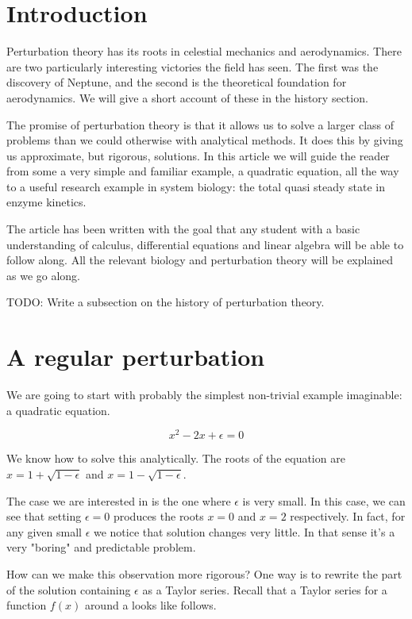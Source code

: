 \documentclass[12pt]{article}
\begin{document}
\section{Introduction}

Perturbation theory has its roots in celestial mechanics and aerodynamics. There
are two particularly interesting victories the field has seen. The first was the
discovery of Neptune, and the second is the theoretical foundation for
aerodynamics. We will give a short account of these in the history section.

The promise of perturbation theory is that it allows us to solve a
larger class of problems than we could otherwise with analytical methods. It
does this by giving us approximate, but rigorous, solutions. In this article we
will guide the reader from some a very simple and familiar example, a quadratic
equation, all the way to a useful research example in system biology: the total
quasi steady state in enzyme kinetics.

The article has been written with the goal that any student with a basic
understanding of calculus, differential equations and linear algebra will be
able to follow along. All the relevant biology and perturbation theory will be
explained as we go along.

TODO: Write a subsection on the history of perturbation theory.

\section{A regular perturbation}

We are going to start with probably the simplest non-trivial example imaginable:
a quadratic equation.

\begin{equation}
x^2 - 2x + \epsilon = 0
\end{equation}

We know how to solve this analytically. The roots of the equation are $x = 1 +
\sqrt{1 - \epsilon}$ and $x = 1 - \sqrt{1 - \epsilon}$.

The case we are interested in is the one where $\epsilon$ is very small. In this
case, we can see that setting $\epsilon=0$ produces the roots $x=0$ and $x=2$
respectively. In fact, for any given small $\epsilon$ we notice that solution
changes very little. In that sense it's a very "boring" and predictable problem.

How can we make this observation more rigorous? One way is to rewrite the part
of the solution containing $\epsilon$ as a Taylor series. Recall that a Taylor
series for a function $f(x)$ around a looks like follows.
\end{document}
